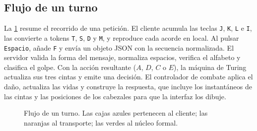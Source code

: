 \documentclass[9pt]{ieeeconf}
\begin{document}
\subsection{Flujo de un turno}
\label{sec:flujo}

La \cref{fig:flujo} resume el recorrido de una petición. El cliente acumula las teclas \texttt{J}, \texttt{K}, \texttt{L} e \texttt{I}, las convierte a tokens \texttt{T}, \texttt{S}, \texttt{D} y \texttt{M}, y reproduce cada acorde en local. Al pulsar \texttt{Espacio}, añade \texttt{F} y envía un objeto JSON con la secuencia normalizada. El servidor valida la forma del mensaje, normaliza espacios, verifica el alfabeto y clasifica el golpe. Con la acción resultante ($A$, $D$, $C$ o $E$), la máquina de Turing actualiza sus tres cintas y emite una decisión. El controlador de combate aplica el daño, actualiza las vidas y construye la respuesta, que incluye los instantáneos de las cintas y las posiciones de los cabezales para que la interfaz los dibuje.

\begin{figure}[!t]
\centering
{}
\caption{Flujo de un turno. Las cajas azules pertenecen al cliente; las naranjas al transporte; las verdes al núcleo formal.}
\label{fig:flujo}
\end{figure}
\end{document}
